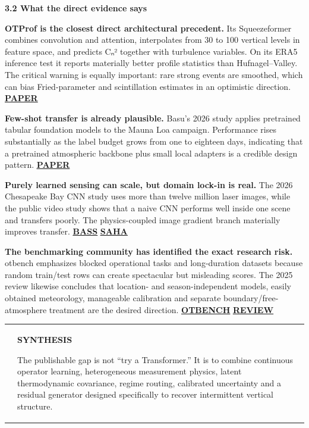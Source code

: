 \documentclass[
]{article}
\begin{document}
\textbf{3.2 What the direct evidence says}

\textbf{OTProf is the closest direct architectural precedent.} Its
Squeezeformer combines convolution and attention, interpolates from 30
to 100 vertical levels in feature space, and predicts Cₙ² together with
turbulence variables. On its ERA5 inference test it reports materially
better profile statistics than Hufnagel--Valley. The critical warning is
equally important: rare strong events are smoothed, which can bias
Fried-parameter and scintillation estimates in an optimistic direction.
\href{https://arxiv.org/abs/2604.09346}{\textbf{\ul{PAPER}}}

\textbf{Few-shot transfer is already plausible.} Basu's 2026 study
applies pretrained tabular foundation models to the Mauna Loa campaign.
Performance rises substantially as the label budget grows from one to
eighteen days, indicating that a pretrained atmospheric backbone plus
small local adapters is a credible design pattern.
\href{https://doi.org/10.1364/AO.585045}{\textbf{\ul{PAPER}}}

\textbf{Purely learned sensing can scale, but domain lock-in is real.}
The 2026 Chesapeake Bay CNN study uses more than twelve million laser
images, while the public video study shows that a naive CNN performs
well inside one scene and transfers poorly. The physics-coupled image
gradient branch materially improves transfer.
\href{https://opg.optica.org/ao/abstract.cfm?uri=ao-65-19-H86}{\textbf{\ul{BASS}}}
\href{https://arxiv.org/abs/2408.16623}{\textbf{\ul{SAHA}}}

\textbf{The benchmarking community has identified the exact research
risk.} otbench emphasizes blocked operational tasks and long-duration
datasets because random train/test rows can create spectacular but
misleading scores. The 2025 review likewise concludes that location- and
season-independent models, easily obtained meteorology, manageable
calibration and separate boundary/free-atmosphere treatment are the
desired direction.
\href{https://arxiv.org/abs/2401.03573}{\textbf{\ul{OTBENCH}}}
\href{https://doi.org/10.1109/ACCESS.2025.3535093}{\textbf{\ul{REVIEW}}}

\begin{longtable}[]{@{}
  >{\raggedright\arraybackslash}p{}
  >{\raggedright\arraybackslash}p{}@{}}
\toprule\noalign{}
\endhead
\bottomrule\noalign{}
\endlastfoot
& \textbf{SYNTHESIS}

The publishable gap is not ``try a Transformer.'' It is to combine
continuous operator learning, heterogeneous measurement physics, latent
thermodynamic covariance, regime routing, calibrated uncertainty and a
residual generator designed specifically to recover intermittent
vertical structure. \\
\end{longtable}
\end{document}
